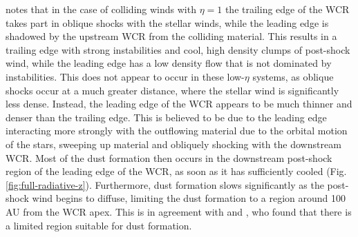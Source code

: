 \textcite{pittard_3d_2009} notes that in the case of colliding winds with $\eta = 1$ the trailing edge of the WCR takes part in oblique shocks with the stellar winds, while the leading edge is shadowed by the upstream WCR from the colliding material.
This results in a trailing edge with strong instabilities and cool, high density clumps of post-shock wind, while the leading edge has a low density flow that is not dominated by instabilities.
This does not appear to occur in these low-$\eta$ systems, as oblique shocks occur at a much greater distance, where the stellar wind is significantly less dense.
Instead, the leading edge of the WCR appears to be much thinner and denser than the trailing edge.
This is believed to be due to the leading edge interacting more strongly with the outflowing material due to the orbital motion of the stars, sweeping up material and obliquely shocking with the downstream WCR. %
Most of the dust formation then occurs in the downstream post-shock region of the leading edge of the WCR, as soon as it has sufficiently cooled (Fig. \ref{fig:full-radiative-z}).
Furthermore, dust formation slows significantly as the post-shock wind begins to diffuse, limiting the dust formation to a region around 100 AU from the WCR apex. %
This is in agreement with \textcite{williams_dust_1990} and \textcite{hendrix_pinwheels_2016}, who found that there is a limited region suitable for dust formation.

